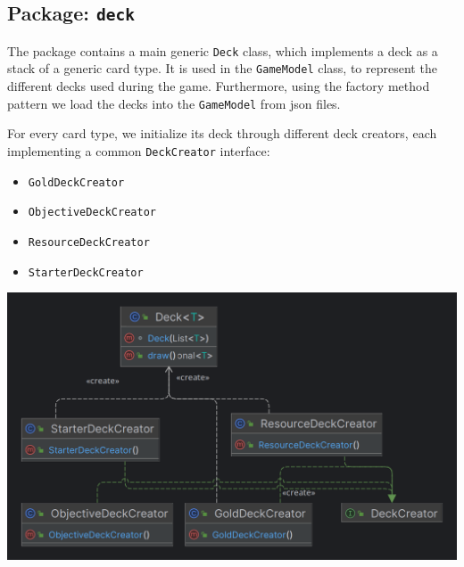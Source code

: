 \documentclass{article}
\begin{document}
\subsection{Package: \texttt{deck}}
The package contains a main generic \texttt{Deck} class, which implements a deck as a stack of a generic card type.
It is used in the \texttt{GameModel} class, to represent the different decks used during the game. \newline
Furthermore, using the factory method pattern we load the decks into the \texttt{GameModel} from json files.

\noindent For every card type, we initialize its deck through different deck creators, each implementing a common \texttt{DeckCreator} interface:
\begin{itemize}
    \item \texttt{GoldDeckCreator}
    \item \texttt{ObjectiveDeckCreator}
    \item \texttt{ResourceDeckCreator}
    \item \texttt{StarterDeckCreator}
\end{itemize}

\begin{center}
    \hspace*{-1cm}\includegraphics[scale=0.3]{deck.png}
\end{center}

\newpage
\end{document}

